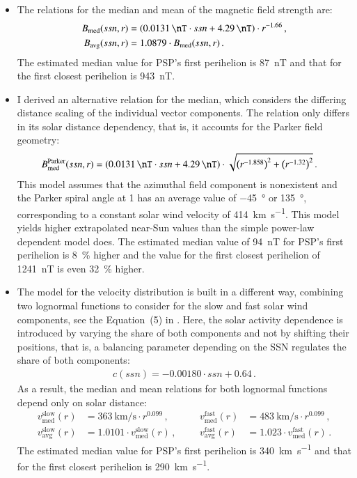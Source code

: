 \begin{itemize}
	\item The relations for the median and mean of the magnetic field strength are:
	\begin{align*}
		B_\text{med}(ssn,r) &= \left(\SI{0.0131}{\nT} \cdot ssn + \SI{4.29}{\nT}\right) \cdot r^{-1.66}	\,,\\
		B_\text{avg}(ssn,r) &= 1.0879 \cdot B_\text{med}(ssn,r)	\,.
	\end{align*}
	 The estimated median value for PSP's first perihelion is \SI{87}{\nano\tesla} and that for the first closest perihelion is \SI{943}{\nano\tesla}.
	
	\item I derived an alternative relation for the median, which considers the differing distance scaling of the individual vector components. The relation only differs in its solar distance dependency, that is, it accounts for the Parker field geometry:
	\begin{align*}
		B^\text{Parker}_\text{med}(ssn,r) &= \left(\SI{0.0131}{\nT} \cdot ssn + \SI{4.29}{\nT}\right) \cdot \sqrt{\left(r^{-1.858}\right)^2 + \left(r^{-1.32}\right)^2}	\,.
	\end{align*}
	This model assumes that the azimuthal field component is nonexistent and the Parker spiral angle at \SI{1}{\au} has an average value of \SI{-45}{\degree} or \SI{135}{\degree}, corresponding to a constant solar wind velocity of \SI{414}{\km\per\s}.
	This model yields higher extrapolated near-Sun values than the simple power-law dependent model does. The estimated median value of \SI{94}{\nano\tesla} for PSP's first perihelion is \SI{8}{\%} higher and the value for the first closest perihelion of \SI{1241}{\nano\tesla} is even \SI{32}{\%} higher.
	
	\item The model for the velocity distribution is built in a different way, combining two lognormal functions to consider for the slow and fast solar wind components, see the Equation~(5) in \citet{Venzmer2018}. Here, the solar activity dependence is introduced by varying the share of both components and not by shifting their positions, that is, a balancing parameter depending on the SSN regulates the share of both components:
	\begin{align*}
		c(ssn) = -0.00180 \cdot ssn + 0.64	\,.
	\end{align*}
	As a result, the median and mean relations for both lognormal functions depend only on solar distance:
	\begin{align*}
		v_\text{med}^\text{slow}(r) &= \SI{363}{\km\per\s} \cdot r^{0.099}	\,,&    &       &v_\text{med}^\text{fast}(r) &= \SI{483}{\km\per\s} \cdot r^{0.099}	\,,\\
		v_\text{avg}^\text{slow}(r) &= 1.0101 \cdot v_\text{med}^\text{slow}(r)	\,,&    &       &v_\text{avg}^\text{fast}(r) &= 1.023 \cdot v_\text{med}^\text{fast}(r)	\,.
	\end{align*}
	 The estimated median value for PSP's first perihelion is \SI{340}{\km\per\s} and that for the first closest perihelion is \SI{290}{\km\per\s}.
	

\end{itemize}
